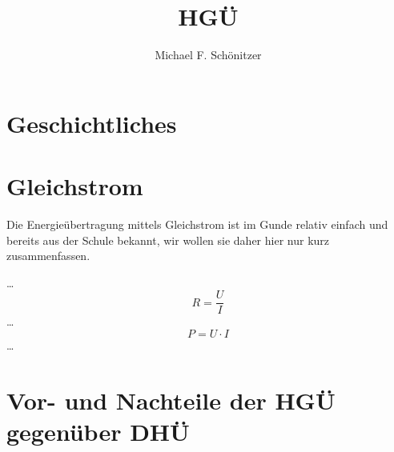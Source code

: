 \documentclass[10pt,a4paper]{article}
\author{Michael F. Schönitzer}
\title{HGÜ}
\begin{document}
\maketitle

\section{Geschichtliches}

\section{Gleichstrom}
Die Energieübertragung mittels Gleichstrom ist im Gunde relativ einfach und bereits aus der Schule bekannt, wir wollen sie daher hier nur kurz zusammenfassen.

…
\begin{equation}
R = \frac{U}{I}
\end{equation}
…
\begin{equation}
P = U \cdot I
\end{equation}
…



\section{Vor- und Nachteile der HGÜ gegenüber DHÜ}
{}

\end{document}
